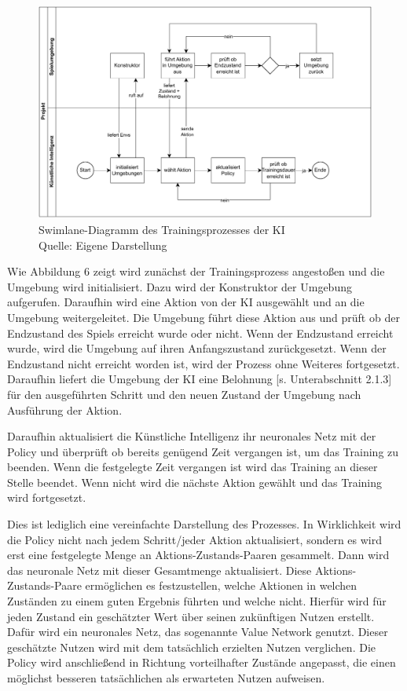 \nopagebreak
\begin{figure}[H]
	\includegraphics[width=1\textwidth]{Bilder/swimlane.drawio.pdf} 
	\caption[Swimlane-Diagramm des Trainingsprozesses der KI]{Swimlane-Diagramm des Trainingsprozesses der KI\\ Quelle: Eigene Darstellung}
\end{figure}	

Wie Abbildung 6 zeigt wird zunächst der Trainingsprozess angestoßen und die Umgebung wird initialisiert. Dazu wird der Konstruktor der Umgebung aufgerufen. Daraufhin wird eine Aktion von der KI ausgewählt und an die Umgebung weitergeleitet. Die Umgebung führt diese Aktion aus und prüft ob der Endzustand des Spiels erreicht wurde oder nicht. Wenn der Endzustand erreicht wurde, wird die Umgebung auf ihren Anfangszustand zurückgesetzt. Wenn der Endzustand nicht erreicht worden ist, wird der Prozess ohne Weiteres fortgesetzt. Daraufhin liefert die Umgebung der KI eine Belohnung [s. Unterabschnitt 2.1.3] für den ausgeführten Schritt und den neuen Zustand der Umgebung nach Ausführung der Aktion.

Daraufhin aktualisiert die Künstliche Intelligenz ihr neuronales Netz mit der Policy und überprüft ob bereits genügend Zeit vergangen ist, um das Training zu beenden. Wenn die festgelegte Zeit vergangen ist wird das Training an dieser Stelle beendet. Wenn nicht wird die nächste Aktion gewählt und das Training wird fortgesetzt.

Dies ist lediglich eine vereinfachte Darstellung des Prozesses. In Wirklichkeit wird die Policy nicht nach jedem Schritt/jeder Aktion aktualisiert, sondern es wird erst eine festgelegte Menge an Aktions-Zustands-Paaren gesammelt. Dann wird das neuronale Netz mit dieser Gesamtmenge aktualisiert. Diese Aktions-Zustands-Paare ermöglichen es festzustellen, welche Aktionen in welchen Zuständen zu einem guten Ergebnis führten und welche nicht. Hierfür wird für jeden Zustand ein geschätzter Wert über seinen zukünftigen Nutzen erstellt. Dafür wird ein neuronales Netz, das sogenannte Value Network genutzt. Dieser geschätzte Nutzen wird mit dem tatsächlich erzielten Nutzen verglichen. Die Policy wird anschließend in Richtung vorteilhafter Zustände angepasst, die einen möglichst besseren tatsächlichen als erwarteten Nutzen aufweisen.

